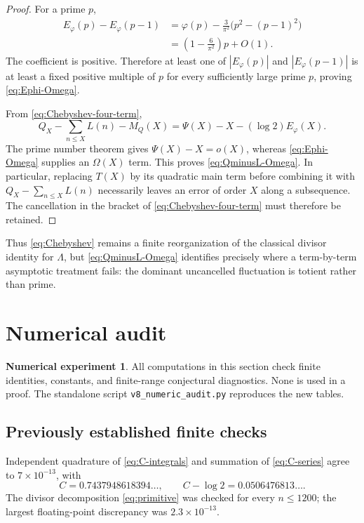 \documentclass[11pt]{amsart}
\numberwithin{equation}{section}
\theoremstyle{definition}
\newtheorem{experiment}[theorem]{Numerical experiment}
\theoremstyle{remark}
\begin{document}
\begin{proof}
For a prime \(p\),
\begin{align*}
 E_\varphi(p)-E_\varphi(p-1)
 &=\varphi(p)-\frac3{\pi^2}\bigl(p^2-(p-1)^2\bigr)\\
 &=\left(1-\frac6{\pi^2}\right)p+O(1).
\end{align*}
The coefficient is positive.  Therefore at least one of
\(|E_\varphi(p)|\) and \(|E_\varphi(p-1)|\) is at least a fixed positive
multiple of \(p\) for every sufficiently large prime \(p\), proving
\eqref{eq:Ephi-Omega}.

From \eqref{eq:Chebyshev-four-term},
\begin{equation}\label{eq:QminusL-decomp}
 Q_X-\sum_{n\leq X}L(n)-M_Q(X)
 =\Psi(X)-X-(\log2)E_\varphi(X).
\end{equation}
The prime number theorem gives \(\Psi(X)-X=o(X)\), whereas
\eqref{eq:Ephi-Omega} supplies an \(\Omega(X)\) term.  This proves
\eqref{eq:QminusL-Omega}.  In particular, replacing \(T(X)\) by its
quadratic main term before combining it with
\(Q_X-\sum_{n\leq X}L(n)\) necessarily leaves an error of order \(X\)
along a subsequence.  The cancellation in the bracket of
\eqref{eq:Chebyshev-four-term} must therefore be retained.
\end{proof}

Thus \eqref{eq:Chebyshev} remains a finite reorganization of the classical
divisor identity for \(\Lambda\), but \eqref{eq:QminusL-Omega} identifies
precisely where a term-by-term asymptotic treatment fails: the dominant
uncancelled fluctuation is totient rather than prime.

\section{Numerical audit}
\label{sec:numerical-audit}

\begin{experiment}\label{exp:audit}
All computations in this section check finite identities, constants, and
finite-range conjectural diagnostics.  None is used in a proof.  The
standalone script \texttt{v8\_numeric\_audit.py} reproduces the new tables.
\end{experiment}

\subsection{Previously established finite checks}

Independent quadrature of \eqref{eq:C-integrals} and summation of
\eqref{eq:C-series} agree to \(7\times10^{-13}\), with
\[
 C=0.7437948618394\ldots,
 \qquad C-\log2=0.0506476813\ldots.
\]
The divisor decomposition \eqref{eq:primitive} was checked for every
\(n\le1200\); the largest floating-point discrepancy was
\(2.3\times10^{-13}\).
\end{document}
